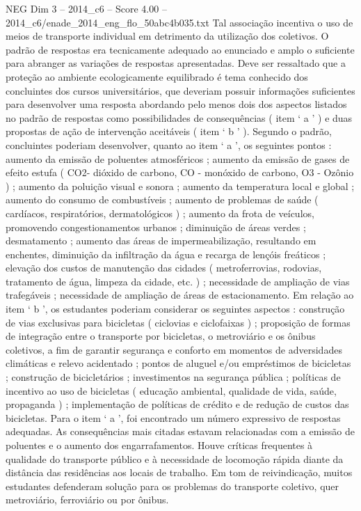 \begin{textsample}{NEG Dim 3 – 2014\_c6 – Score 4.00 – 2014\_c6/enade\_2014\_eng\_flo\_50abc4b035.txt}
Tal associação incentiva o uso de meios de transporte individual em detrimento da utilização dos coletivos.
O padrão de respostas era tecnicamente adequado ao enunciado e amplo o suficiente para abranger as variações de respostas apresentadas.
Deve ser ressaltado que a proteção ao ambiente ecologicamente equilibrado é tema conhecido dos concluintes dos cursos universitários, que deveriam possuir informações suficientes para desenvolver uma resposta abordando pelo menos dois dos aspectos listados no padrão de respostas como possibilidades de consequências ( item ‘ a ’ ) e duas propostas de ação de intervenção aceitáveis ( item ‘ b ’ ).
Segundo o padrão, concluintes poderiam desenvolver, quanto ao item ‘ a ’, os seguintes pontos : aumento da emissão de poluentes atmosféricos ; aumento da emissão de gases de efeito estufa ( CO2- dióxido de carbono, CO - monóxido de carbono, O3 - Ozônio ) ; aumento da poluição visual e sonora ; aumento da temperatura local e global ; aumento do consumo de combustíveis ; aumento de problemas de saúde ( cardíacos, respiratórios, dermatológicos ) ; aumento da frota de veículos, promovendo congestionamentos urbanos ; diminuição de áreas verdes ; desmatamento ; aumento das áreas de impermeabilização, resultando em enchentes, diminuição da infiltração da água e recarga de lençóis freáticos ; elevação dos custos de manutenção das cidades ( metroferrovias, rodovias, tratamento de água, limpeza da cidade, etc. ) ; necessidade de ampliação de vias trafegáveis ; necessidade de ampliação de áreas de estacionamento.
Em relação ao item ‘ b ’, os estudantes poderiam considerar os seguintes aspectos : construção de vias exclusivas para bicicletas ( ciclovias e ciclofaixas ) ; proposição de formas de integração entre o transporte por bicicletas, o metroviário e os ônibus coletivos, a fim de garantir segurança e conforto em momentos de adversidades climáticas e relevo acidentado ; pontos de aluguel e/ou empréstimos de bicicletas ; construção de bicicletários ; investimentos na segurança pública ; políticas de incentivo ao uso de bicicletas ( educação ambiental, qualidade de vida, saúde, propaganda ) ; implementação de políticas de crédito e de redução de custos das bicicletas.
Para o item ‘ a ’, foi encontrado um número expressivo de respostas adequadas.
As consequências mais citadas estavam relacionadas com a emissão de poluentes e o aumento dos engarrafamentos.
Houve críticas frequentes à qualidade do transporte público e à necessidade de locomoção rápida diante da distância das residências aos locais de trabalho.
Em tom de reivindicação, muitos estudantes defenderam solução para os problemas do transporte coletivo, quer metroviário, ferroviário ou por ônibus.

\end{textsample}
